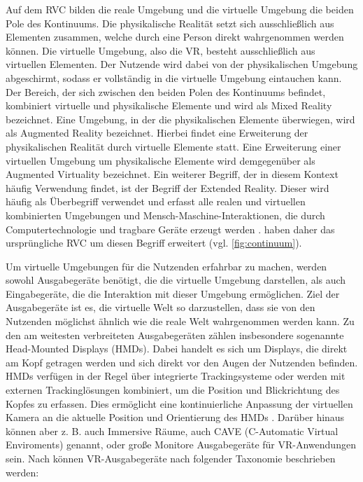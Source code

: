 Auf dem RVC bilden die reale Umgebung und die virtuelle
Umgebung die beiden Pole des Kontinuums. Die physikalische Realität setzt sich ausschließlich aus Elementen zusammen, welche durch eine Person direkt wahrgenommen werden können. Die virtuelle Umgebung, also die VR, besteht ausschließlich aus virtuellen Elementen. Der Nutzende wird dabei von der physikalischen Umgebung abgeschirmt, sodass er vollständig in die virtuelle Umgebung eintauchen kann. Der Bereich, der sich zwischen den beiden Polen des Kontinuums befindet, kombiniert virtuelle und physikalische Elemente und wird als Mixed Reality bezeichnet. Eine Umgebung, in der die physikalischen Elemente überwiegen, wird als Augmented Reality bezeichnet. Hierbei findet eine Erweiterung der physikalischen Realität durch virtuelle Elemente statt. Eine Erweiterung einer virtuellen Umgebung um physikalische Elemente wird demgegenüber als Augmented Virtuality bezeichnet. 
Ein weiterer Begriff, der in diesem Kontext häufig Verwendung findet, ist der Begriff der Extended Reality. Dieser wird häufig als Überbegriff verwendet und erfasst alle realen und virtuellen kombinierten Umgebungen und Mensch-Maschine-Interaktionen, die durch Computertechnologie und tragbare Geräte erzeugt werden \citep{fast-berglund_testing_2018}. \citet{wohlgenannt_virtual_2020} haben daher das ursprüngliche RVC um diesen Begriff erweitert (vgl. \autoref{fig:continuum}). 
 
Um virtuelle Umgebungen für die Nutzenden erfahrbar zu machen, werden sowohl Ausgabegeräte benötigt, die die virtuelle Umgebung darstellen, als auch Eingabegeräte, die die Interaktion mit dieser Umgebung ermöglichen. Ziel der Ausgabegeräte ist es, die virtuelle Welt so darzustellen, dass sie von den Nutzenden möglichst ähnlich wie die reale Welt wahrgenommen werden kann. Zu den am weitesten verbreiteten Ausgabegeräten zählen insbesondere sogenannte Head-Mounted Displays (HMDs). Dabei handelt es sich um Displays, die direkt am Kopf getragen werden und sich direkt vor den Augen der Nutzenden befinden. HMDs verfügen in der Regel über integrierte Trackingsysteme oder werden mit externen Trackinglösungen kombiniert, um die Position und Blickrichtung des Kopfes zu erfassen. Dies ermöglicht eine kontinuierliche Anpassung der virtuellen Kamera an die aktuelle Position und Orientierung des HMDs \citep{dorner_virtual_2019}. Darüber hinaus können aber z. B. auch Immersive Räume, auch CAVE (C-Automatic Virtual Enviroments) genannt, oder große Monitore Ausgabegeräte für VR-Anwendungen sein. Nach \citet{somrak_estimating_2019} können VR-Ausgabegeräte nach folgender Taxonomie beschrieben werden: 

